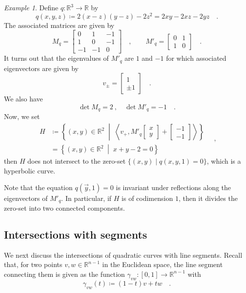 \documentclass[pdftex,a4paper,12pt]{scrartcl}
\theoremstyle{plain}
\theoremstyle{definition}
\theoremstyle{remark}
\newtheorem{example}[theorem]{Example}
\begin{document}
\begin{example}
Define $q:\mathbb R^3\to\mathbb R$ by
\[
q(x,y,z)
\coloneqq 2(x-z)(y-z) - 2z^2 = 2xy - 2xz - 2yz
\quad.
\]
The associated matrices are given by
\[
M_q =
\begin{bmatrix}
0 & 1 & -1 \\
1 & 0 & -1 \\
-1 & -1 & 0
\end{bmatrix}
\quad,\qquad
M'_q =
\begin{bmatrix}
0 & 1 \\ 1 & 0
\end{bmatrix}
\quad.
\]
It turns out that the eigenvalues of $M'_q$ are $1$ and $-1$ for which associated eigenvectors are given by
\[
v_\pm =
\begin{bmatrix}
1 \\ \pm 1
\end{bmatrix}
\quad.
\]
We also have
\[
\det M_q = 2
\ ,\quad
\det M'_q = -1
\quad.
\]
Now, we set
\[
\begin{split}
H
&\coloneqq\left\{
(x,y)\in\mathbb R^2
\;\middle|\;
\left\langle v_+,M'_q\begin{bmatrix} x \\ y \end{bmatrix} + \begin{bmatrix} -1 \\ -1 \end{bmatrix}\right\rangle
\right\}
\\
&= \left\{
(x,y)\in\mathbb R^2
\;\middle|\;
x+y-2 = 0
\right\}
\end{split}
\quad,
\]
then $H$ does not intersect to the zero-set $\{(x,y)\mid q(x,y,1)=0\}$, which is a hyperbolic curve.
\end{example}

Note that the equation $q(\vec y,1)=0$ is invariant under reflections along the eigenvectors of $M'_q$.
In particular, if $H$ is of codimension $1$, then it divides the zero-set into two connected components.

\subsection{Intersections with segments}

We next discuss the intersections of quadratic curves with line segments.
Recall that, for two points $v,w\in\mathbb R^{n-1}$ in the Euclidean space, the line segment connecting them is given as the function $\gamma_{vw}:[0,1]\to\mathbb R^{n-1}$ with
\[
\gamma_{vw}(t)\coloneqq (1-t)v + tw
\quad.
\]
\end{document}
